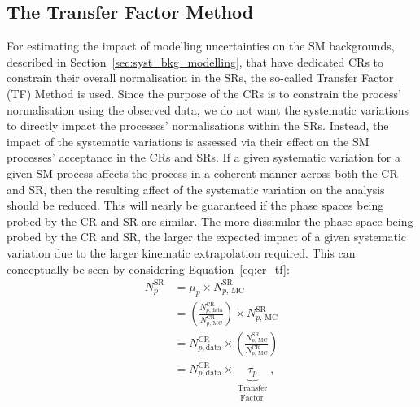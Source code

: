 %
%
\subsection{The Transfer Factor Method}
\label{sec:transfer_factor}

For estimating the impact of modelling uncertainties on the SM backgrounds, described in Section~\ref{sec:syst_bkg_modelling},  that
have dedicated CRs to constrain their overall normalisation in the SRs,
the so-called Transfer Factor (TF) Method is used.
Since the purpose of the CRs is to constrain the process' normalisation using
the observed data, we do not want the systematic variations to directly
impact the processes' normalisations within the SRs.
Instead, the impact of the systematic variations is assessed via their effect
on the SM processes' acceptance in the CRs and SRs.
If a given systematic variation for a given SM process affects the process
in a coherent manner across both the CR and SR, then the resulting affect of the systematic variation
on the analysis should be reduced.
This will nearly be guaranteed if the phase spaces being probed by the CR and SR
are similar.
The more dissimilar the phase space being probed by the CR and SR, the larger
the expected impact of a given systematic variation due to the larger kinematic
extrapolation required.
This can conceptually be seen by considering Equation~\ref{eq:cr_tf}:
\begin{align}
    N_{p}^{\text{SR}} &= \mu_p \times N_{p,\,\text{MC}}^{\text{SR}} \nonumber \\
        &= \left( \frac{N_{p, \text{data}}^{\text{CR}}}{N_{p,\,\text{MC}}^{\text{CR}}} \right) \times N_{p,\,\text{MC}}^{\text{SR}} \nonumber \\
        &= N_{p, \text{data}}^{\text{CR}} \times \left( \frac{ N_{p,\,\text{MC}}^{\text{SR}}  }{ N_{p,\,\text{MC}}^{\text{CR}} } \right) \label{eq:cr_tf} \\
        &= N_{p, \text{data}}^{\text{CR}} \times \underbrace{\tau_p}_{\substack{\text{Transfer} \\ \text{ Factor}}} \nonumber,
\end{align}
